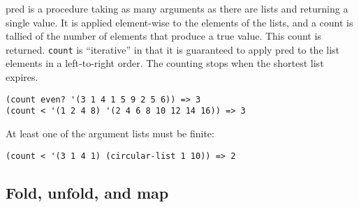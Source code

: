 \begin{entry}{%
  }


  pred is a procedure
  taking as many arguments as there are lists and returning a single
  value. It is applied element-wise to the elements of the lists, and
  a count is tallied of the number of elements that produce a true
  value. This count is returned. \texttt{count} is ``iterative'' in
  that it is guaranteed to apply pred to the list elements in a
  left-to-right order. The counting stops when the shortest list
  expires.

\begin{verbatim}
(count even? '(3 1 4 1 5 9 2 5 6)) => 3
(count < '(1 2 4 8) '(2 4 6 8 10 12 14 16)) => 3
\end{verbatim}

  At least one of the argument lists must be finite:

\begin{verbatim}
(count < '(3 1 4 1) (circular-list 1 10)) => 2
\end{verbatim}
\end{entry}


\subsection{{Fold, unfold, and map}}

